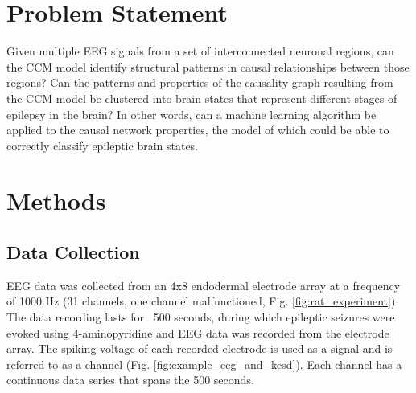\documentclass[journal,12pt,onecolumn,draftclsnofoot]{IEEEtran}  %
\begin{document}


% 

\clearpage

\clearpage



% 



\section{Problem Statement}

Given multiple EEG signals from a set of interconnected neuronal regions, can the CCM model identify structural patterns in causal relationships between those regions? Can the patterns and properties of the causality graph resulting from the CCM model be clustered into brain states that represent different stages of epilepsy in the brain? In other words, can a machine learning algorithm be applied to the causal network properties, the model of which could be able to correctly classify epileptic brain states.

\section{Methods}
\subsection{Data Collection}
EEG data was collected from an 4x8 endodermal electrode array at a frequency of 1000 Hz (31 channels, one channel malfunctioned, Fig. \ref{fig:rat_experiment}). The data recording lasts for ~500 seconds, during which epileptic seizures were evoked using 4-aminopyridine and EEG data was recorded from the electrode array. The spiking voltage of each recorded electrode is used as a signal and is referred to as a channel (Fig. \ref{fig:example_eeg_and_kcsd}). Each channel has a continuous data series that spans the 500 seconds.
\end{document}
